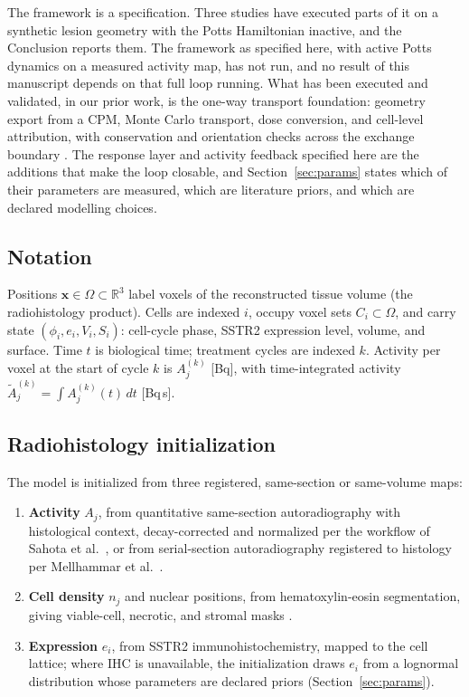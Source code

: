 \documentclass[11pt]{article}
\begin{document}
The framework is a specification. Three studies have executed parts of it on a synthetic
lesion geometry with the Potts Hamiltonian inactive, and the Conclusion reports them. The
framework as specified here, with active Potts dynamics on a measured activity map, has not
run, and no result of this manuscript depends on that full loop running. What has been executed and validated, in our prior work, is the one-way
transport foundation: geometry export from a CPM, Monte Carlo transport, dose conversion,
and cell-level attribution, with conservation and orientation checks across the exchange
boundary \cite{kinder2026biofilm}. The response layer and activity feedback specified here
are the additions that make the loop closable, and Section~\ref{sec:params} states which
of their parameters are measured, which are literature priors, and which are declared
modelling choices.

\subsection{Notation}

Positions $\bm{x} \in \Omega \subset \mathbb{R}^3$ label voxels of the reconstructed
tissue volume (the radiohistology product). Cells are indexed $i$, occupy voxel sets
$C_i \subset \Omega$, and carry state $(\phi_i, e_i, V_i, S_i)$: cell-cycle phase,
SSTR2 expression level, volume, and surface. Time $t$ is biological time; treatment
cycles are indexed $k$. Activity per voxel at the start of cycle $k$ is $A^{(k)}_j$
[Bq], with time-integrated activity $\tilde{A}^{(k)}_j = \int A^{(k)}_j(t)\,dt$ [Bq\,s].

\subsection{Radiohistology initialization}\label{sec:init}

The model is initialized from three registered, same-section or same-volume maps:

\begin{enumerate}
\item \textbf{Activity} $A_j$, from quantitative same-section autoradiography with
histological context, decay-corrected and normalized per the workflow of Sahota et al.\
\cite{sahota2025}, or from serial-section autoradiography registered to histology per
Mellhammar et al.\ \cite{mellhammar2023}.
\item \textbf{Cell density} $n_j$ and nuclear positions, from hematoxylin-eosin
segmentation, giving viable-cell, necrotic, and stromal masks
\cite{mellhammar2023,sahota2025}.
\item \textbf{Expression} $e_i$, from SSTR2 immunohistochemistry, mapped to the cell
lattice; where IHC is unavailable, the initialization draws $e_i$ from a lognormal
distribution whose parameters are declared priors (Section~\ref{sec:params}).
\end{enumerate}
\end{document}
